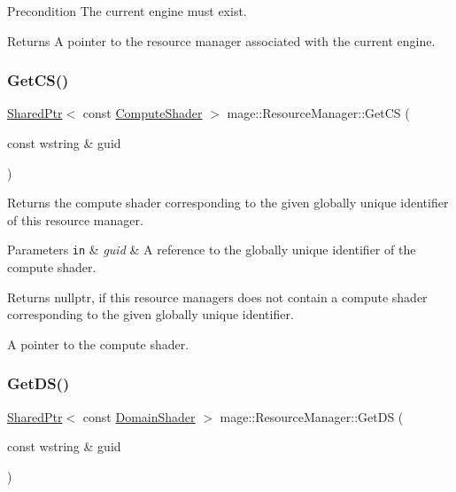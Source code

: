 \begin{DoxyPrecond}{Precondition}
The current engine must exist. 
\end{DoxyPrecond}
\begin{DoxyReturn}{Returns}
A pointer to the resource manager associated with the current engine. 
\end{DoxyReturn}
\hypertarget{classmage_1_1_resource_manager_a87967af3f0896373023c858db4a8307b}{}\label{classmage_1_1_resource_manager_a87967af3f0896373023c858db4a8307b} 
\subsubsection{\texorpdfstring{Get\+C\+S()}{GetCS()}}
{\footnotesize\ttfamily \hyperlink{namespacemage_a1e01ae66713838a7a67d30e44c67703e}{Shared\+Ptr}$<$ const \hyperlink{namespacemage_ae040329401484b076f0cd1a7c43d19c9}{Compute\+Shader} $>$ mage\+::\+Resource\+Manager\+::\+Get\+CS (\begin{DoxyParamCaption}\item[{const wstring \&}]{guid }\end{DoxyParamCaption})\hspace{0.3cm}{\ttfamily [noexcept]}}

Returns the compute shader corresponding to the given globally unique identifier of this resource manager.


\begin{DoxyParams}[1]{Parameters}
\mbox{\tt in}  & {\em guid} & A reference to the globally unique identifier of the compute shader. \\
\hline
\end{DoxyParams}
\begin{DoxyReturn}{Returns}
{\ttfamily nullptr}, if this resource managers does not contain a compute shader corresponding to the given globally unique identifier. 

A pointer to the compute shader. 
\end{DoxyReturn}
\hypertarget{classmage_1_1_resource_manager_a8456ada6f4938fb1c8220cfe988ad8a7}{}\label{classmage_1_1_resource_manager_a8456ada6f4938fb1c8220cfe988ad8a7} 
\subsubsection{\texorpdfstring{Get\+D\+S()}{GetDS()}}
{\footnotesize\ttfamily \hyperlink{namespacemage_a1e01ae66713838a7a67d30e44c67703e}{Shared\+Ptr}$<$ const \hyperlink{namespacemage_aef8cda73e2387cb89baa6c54a7fea542}{Domain\+Shader} $>$ mage\+::\+Resource\+Manager\+::\+Get\+DS (\begin{DoxyParamCaption}\item[{const wstring \&}]{guid }\end{DoxyParamCaption})\hspace{0.3cm}{\ttfamily [noexcept]}}

